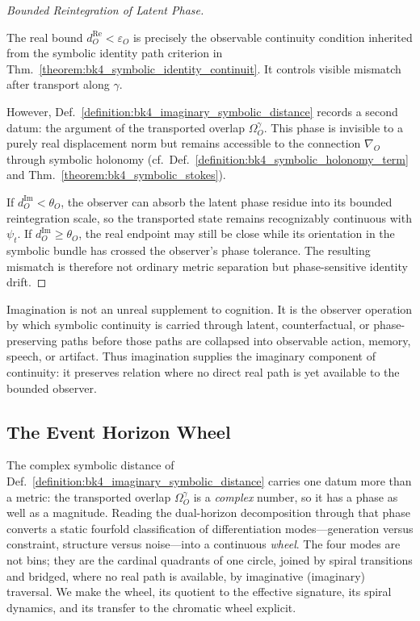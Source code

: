 \begin{proof}[Bounded Reintegration of Latent Phase]
\label{proof:bk4_imaginative_continuity_principle}
\leavevmode

The real bound $d_O^{\mathrm{Re}} < \varepsilon_O$ is precisely the observable continuity condition inherited from the symbolic identity path criterion in Thm.~\ref{theorem:bk4_symbolic_identity_continuit}. It controls visible mismatch after transport along $\gamma$.

However, Def.~\ref{definition:bk4_imaginary_symbolic_distance} records a second datum: the argument of the transported overlap $\Omega_O^\gamma$. This phase is invisible to a purely real displacement norm but remains accessible to the connection $\nabla_O$ through symbolic holonomy (cf.~Def.~\ref{definition:bk4_symbolic_holonomy_term} and Thm.~\ref{theorem:bk4_symbolic_stokes}).

If $d_O^{\mathrm{Im}} < \theta_O$, the observer can absorb the latent phase residue into its bounded reintegration scale, so the transported state remains recognizably continuous with $\psi_t$. If $d_O^{\mathrm{Im}} \geq \theta_O$, the real endpoint may still be close while its orientation in the symbolic bundle has crossed the observer's phase tolerance. The resulting mismatch is therefore not ordinary metric separation but phase-sensitive identity drift.
\end{proof}

\begin{scholium}
\label{scholium:bk4_imagination_as_imaginary_traversal}
Imagination is not an unreal supplement to cognition. It is the observer operation by which symbolic continuity is carried through latent, counterfactual, or phase-preserving paths before those paths are collapsed into observable action, memory, speech, or artifact. Thus imagination supplies the imaginary component of continuity: it preserves relation where no direct real path is yet available to the bounded observer.
\end{scholium}

\subsection{The Event Horizon Wheel}
\label{subsec:bk4_event_horizon_wheel}
The complex symbolic distance of
Def.~\ref{definition:bk4_imaginary_symbolic_distance} carries one datum more than a
metric: the transported overlap $\Omega_O^\gamma$ is a \emph{complex} number, so it
has a phase as well as a magnitude. Reading the dual-horizon decomposition through
that phase converts a static fourfold classification of differentiation
modes---generation versus constraint, structure versus noise---into a continuous
\emph{wheel}. The four modes are not bins; they are the cardinal quadrants of one
circle, joined by spiral transitions and bridged, where no real path is available,
by imaginative (imaginary) traversal. We make the wheel, its quotient to the
effective signature, its spiral dynamics, and its transfer to the chromatic wheel
explicit.


